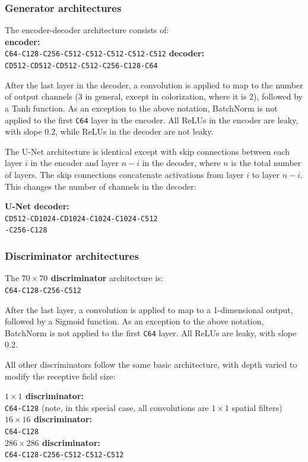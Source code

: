 \documentclass[10pt,twocolumn,letterpaper]{article}
\begin{document}
\subsubsection{Generator architectures}

The encoder-decoder architecture consists of:\\
{\bf encoder:}\\
\texttt{C64-C128-C256-C512-C512-C512-C512-C512}
{\bf decoder:}\\
\texttt{CD512-CD512-CD512-C512-C256-C128-C64}

After the last layer in the decoder, a convolution is applied to map to the number of output channels (3 in general, except in colorization, where it is 2), followed by a Tanh function. As an exception to the above notation, BatchNorm is not applied to the first \texttt{C64} layer in the encoder. All ReLUs in the encoder are leaky, with slope 0.2, while ReLUs in the decoder are not leaky.

The U-Net architecture is identical except with skip connections between each layer $i$ in the encoder and layer $n-i$ in the decoder, where $n$ is the total number of layers. The skip connections concatenate activations from layer $i$ to layer $n-i$. This changes the number of channels in the decoder:

{\bf U-Net decoder:}\\
\texttt{CD512-CD1024-CD1024-C1024-C1024-C512\\-C256-C128}


\subsubsection{Discriminator architectures}

The {\bf $70 \times 70$ discriminator} architecture is:\\
\texttt{C64-C128-C256-C512}

After the last layer, a convolution is applied to map to a 1-dimensional output, followed by a Sigmoid function. As an exception to the above notation, BatchNorm is not applied to the first \texttt{C64} layer. All ReLUs are leaky, with slope 0.2.

All other discriminators follow the same basic architecture, with depth varied to modify the receptive field size:

{\bf $1 \times 1$ discriminator:} \\\texttt{C64-C128} (note, in this special case, all convolutions are $1 \times 1$ spatial filters)\\
{\bf $16 \times 16$ discriminator:} \\\texttt{C64-C128}\\
{\bf $286 \times 286$ discriminator:} \\\texttt{C64-C128-C256-C512-C512-C512}\\
\end{document}
